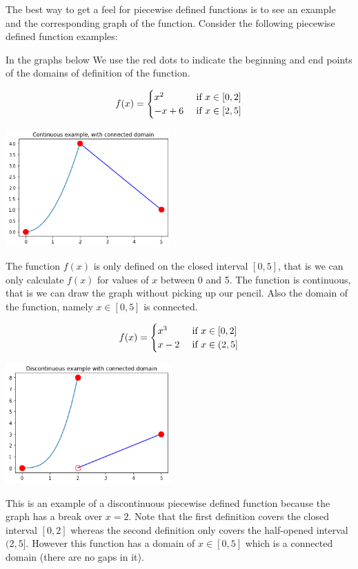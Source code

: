 \documentclass[10pt]{article}
\begin{document}
The best way to get a feel for piecewise defined functions is to see an
example and the corresponding graph of the function.
Consider the following piecewise defined function examples:
\begin{note}
In the graphs below We use the red dots to indicate the beginning
and end points of the domains of definition of the function.
\end{note}
\begin{example}
\label{ex:1}
$$
f(x) =
\begin{cases}
x^2 & \hbox{ if } x\in [0,2] \\
-x+6 & \hbox{ if } x \in [2, 5]
\end{cases}
$$
\begin{center}
\includegraphics[width=2.5in]{graph1}
\end{center}
The function $f(x)$ is only defined on the closed interval $[0, 5]$, that is
we can only calculate $f(x)$ for values of $x$ between 0 and 5.  The function
is continuous, that is we can draw the graph without picking up our pencil.
Also the domain of the function, namely $x \in [0,5]$ is connected.
\end{example}
\begin{example}
\label{ex:2}
$$
f(x) =
\begin{cases}
x^3 & \hbox{ if } x\in [0,2] \\
x-2 & \hbox{ if } x \in (2, 5]
\end{cases}
$$
\begin{center}
\includegraphics[width=2.5in]{graph2}
\end{center}
This is an example of a discontinuous piecewise defined function because the
graph has a break over $x=2$.  Note that the first definition covers the
closed interval $[0,2]$ whereas the second definition only covers the
half-opened interval $(2,5]$.  However this function has a domain of
$x \in [0, 5]$ which is a connected domain (there are no gaps in it).
\end{example}
\end{document}
